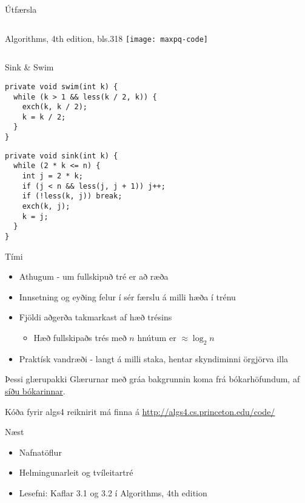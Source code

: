 \documentclass[handout]{beamer}
\begin{document}
\headandfoot

\begin{frame}{Útfærsla}
	\begin{columns}
		Algorithms, 4th edition, bls.318
		\texttt{[image: maxpq-code]}
	\end{columns}
\end{frame}

\headonly

\begin{frame}[fragile]{Sink \& Swim}

		\begin{verbatim}
private void swim(int k) {
  while (k > 1 && less(k / 2, k)) {
    exch(k, k / 2);
    k = k / 2;
  }
}
		\end{verbatim}

		
		\begin{verbatim}
private void sink(int k) {
  while (2 * k <= n) {
    int j = 2 * k;
    if (j < n && less(j, j + 1)) j++;
    if (!less(k, j)) break;
    exch(k, j);
    k = j;
  }
}
		\end{verbatim}
		
\end{frame}

\headandfoot

\begin{frame}{Tími}
	\begin{itemize}
		\item Athugum - um fullskipuð tré er að ræða
		\item Innsetning og eyðing felur í sér færslu á milli hæða í trénu
		\item Fjöldi aðgerða takmarkast af hæð trésins
		      \begin{itemize}
			      \item Hæð fullskipaðs trés með $n$ hnútum er $\approx \log_2 n $
		      \end{itemize}
		\item Praktísk vandræði - langt á milli staka, hentar skyndiminni örgjörva illa
	\end{itemize}
\end{frame}

\begin{frame}{Þessi glærupakki}
	Glærurnar með gráa bakgrunnin koma frá bókarhöfundum, af \href{http://algs4.cs.princeton.edu/lectures/}{síðu bókarinnar}.

	Kóða fyrir algs4 reiknirit má finna á \url{http://algs4.cs.princeton.edu/code/}
\end{frame}

\begin{frame}{Næst}
	\begin{itemize}
		\item Nafnatöflur
		\item Helmingunarleit og tvíleitartré
		\item Lesefni: Kaflar 3.1 og 3.2 í Algorithms, 4th edition
	\end{itemize}
\end{frame}
\end{document}
